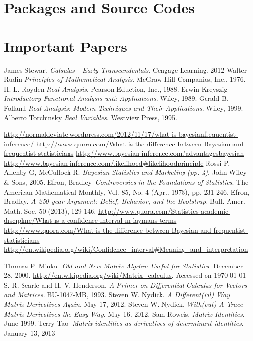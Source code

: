 \documentclass{book}
\begin{document}
\section{Packages and Source Codes}
\section{Important Papers}



\begin{thebibliography}{100} %
 James Stewart {\em{Calsulus - Early Transcendentals}}. Cengage Learning, 2012
 Walter Rudin {\em{Principles of Mathematical Analysis}}. McGraw-Hill Companies, Inc., 1976.
 H. L. Royden {\em{Real Analysis}}. Pearson Eduction, Inc., 1988.
 Erwin Kreyszig {\em{Introductory Functional Analysis with Applications}}. Wiley, 1989.
 Gerald B. Folland {\em{Real Analysis: Modern Techniques and Their Applications}}. Wiley, 1999.
 Alberto Torchinsky {\em{Real Variables}}. Westview Press, 1995.

 {\url{http://normaldeviate.wordpress.com/2012/11/17/what-is-bayesianfrequentist-inference/}}
 {\url{http://www.quora.com/What-is-the-difference-between-Bayesian-and-frequentist-statisticians}}
 {\url{http://www.bayesian-inference.com/advantagesbayesian}}
 {\url{http://www.bayesian-inference.com/likelihood#likelihoodprinciple}}
 Rossi P, Allenby G, McCulloch R. {\emph{Bayesian Statistics and Marketing (pp. 4)}}. John Wiley \& Sons, 2005.
 Efron, Bradley. {\emph{Controversies in the Foundations of Statistics}}. The American Mathematical Monthly, Vol. 85, No. 4 (Apr., 1978), pp. 231-246.
 Efron, Bradley. {\emph{A 250-year Argument: Belief, Behavior, and the Bootstrap}}. Bull. Amer. Math. Soc. 50 (2013), 129-146.
 {\url{http://www.quora.com/Statistics-academic-discipline/What-is-a-confidence-interval-in-laymans-terms}}
 {\url{http://www.quora.com/What-is-the-difference-between-Bayesian-and-frequentist-statisticians}}
 {\url{http://en.wikipedia.org/wiki/Confidence_interval#Meaning_and_interpretation}}

 Thomas P. Minka. {\em{Old and New Matrix Algebra Useful for Statistics}}. December 28, 2000.
 \url{http://en.wikipedia.org/wiki/Matrix_calculus}. Accessed on \today
{} S. R. Searle and H. V. Henderson. {\em{A Primer on Differential Calculus for Vectors and Matrices}}. BU-1047-MB, 1993.
 Steven W. Nydick. {\em{A Different(ial) Way Matrix Derivatives Again}}. May 17, 2012.
 Steven W. Nydick. {\em{With(out) A Trace Matrix Derivatives the Easy Way}}. May 16, 2012.
 Sam Roweis. {\em{Matrix Identities}}. June 1999.
 Terry Tao. {\em{Matrix identities as derivatives of determinant identities}}. January 13, 2013
\end{thebibliography}
\end{document}
